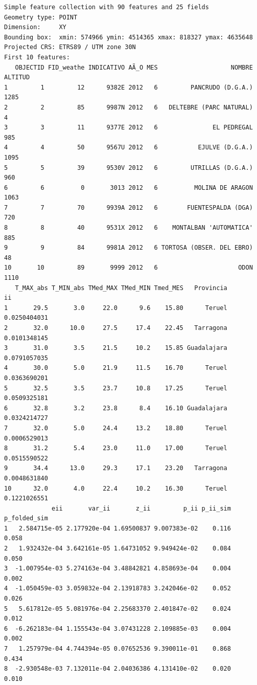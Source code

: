 \documentclass[
  letterpaper,
  DIV=11,
  numbers=noendperiod]{scrreprt}
\begin{document}
\begin{verbatim}
Simple feature collection with 90 features and 25 fields
Geometry type: POINT
Dimension:     XY
Bounding box:  xmin: 574966 ymin: 4514365 xmax: 818327 ymax: 4635648
Projected CRS: ETRS89 / UTM zone 30N
First 10 features:
   OBJECTID FID_weathe INDICATIVO AÃ_O MES                    NOMBRE ALTITUD
1         1         12      9382E 2012   6         PANCRUDO (D.G.A.)    1285
2         2         85      9987N 2012   6   DELTEBRE (PARC NATURAL)       4
3         3         11      9377E 2012   6               EL PEDREGAL     985
4         4         50      9567U 2012   6           EJULVE (D.G.A.)    1095
5         5         39      9530V 2012   6         UTRILLAS (D.G.A.)     960
6         6          0       3013 2012   6          MOLINA DE ARAGON    1063
7         7         70      9939A 2012   6        FUENTESPALDA (DGA)     720
8         8         40      9531X 2012   6    MONTALBAN 'AUTOMATICA'     885
9         9         84      9981A 2012   6 TORTOSA (OBSER. DEL EBRO)      48
10       10         89       9999 2012   6                      ODON    1110
   T_MAX_abs T_MIN_abs TMed_MAX TMed_MIN Tmed_MES   Provincia           ii
1       29.5       3.0     22.0      9.6    15.80      Teruel 0.0250404031
2       32.0      10.0     27.5     17.4    22.45   Tarragona 0.0101348145
3       31.0       3.5     21.5     10.2    15.85 Guadalajara 0.0791057035
4       30.0       5.0     21.9     11.5    16.70      Teruel 0.0363690201
5       32.5       3.5     23.7     10.8    17.25      Teruel 0.0509325181
6       32.8       3.2     23.8      8.4    16.10 Guadalajara 0.0324214727
7       32.0       5.0     24.4     13.2    18.80      Teruel 0.0006529013
8       31.2       5.4     23.0     11.0    17.00      Teruel 0.0515590522
9       34.4      13.0     29.3     17.1    23.20   Tarragona 0.0048631840
10      32.0       4.0     22.4     10.2    16.30      Teruel 0.1221026551
             eii       var_ii       z_ii         p_ii p_ii_sim p_folded_sim
1   2.584715e-05 2.177920e-04 1.69500837 9.007383e-02    0.116        0.058
2   1.932432e-04 3.642161e-05 1.64731052 9.949424e-02    0.084        0.050
3  -1.007954e-03 5.274163e-04 3.48842821 4.858693e-04    0.004        0.002
4  -1.050459e-03 3.059832e-04 2.13918783 3.242046e-02    0.052        0.026
5   5.617812e-05 5.081976e-04 2.25683370 2.401847e-02    0.024        0.012
6  -6.262183e-04 1.155543e-04 3.07431228 2.109885e-03    0.004        0.002
7   1.257979e-04 4.744394e-05 0.07652536 9.390011e-01    0.868        0.434
8  -2.930548e-03 7.132011e-04 2.04036386 4.131410e-02    0.020        0.010

\end{verbatim}
\end{document}
